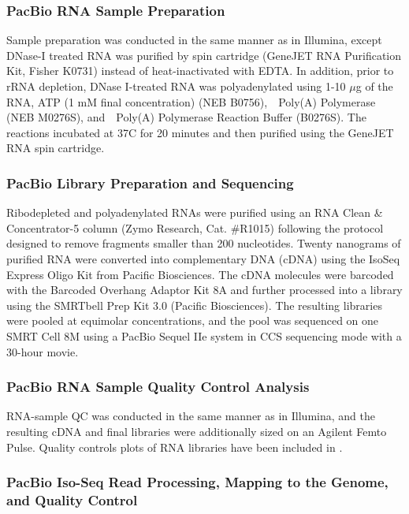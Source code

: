 \subsubsection{PacBio RNA Sample Preparation}

Sample preparation was conducted in the same manner as in Illumina, except DNase-I treated RNA was purified by spin cartridge (GeneJET RNA Purification Kit, Fisher K0731) instead of heat-inactivated with EDTA.
In addition, prior to rRNA depletion, DNase I-treated RNA was polyadenylated using 1-10 $\mu$g of the RNA, ATP (1 mM final concentration) (NEB B0756),~\eco~Poly(A) Polymerase (NEB M0276S), and~\eco~Poly(A) Polymerase Reaction Buffer (B0276S).
The reactions incubated at 37\textdegree C for 20 minutes and then purified using the GeneJET RNA spin cartridge.

\subsubsection{PacBio Library Preparation and Sequencing}

Ribodepleted and polyadenylated RNAs were purified using an RNA Clean \& Concentrator-5 column (Zymo Research, Cat. \#R1015) following the protocol designed to remove fragments smaller than 200 nucleotides.
Twenty nanograms of purified RNA were converted into complementary DNA (cDNA) using the IsoSeq Express Oligo Kit from Pacific Biosciences.
The cDNA molecules were barcoded with the Barcoded Overhang Adaptor Kit 8A and further processed into a library using the SMRTbell Prep Kit 3.0 (Pacific Biosciences).
The resulting libraries were pooled at equimolar concentrations, and the pool was sequenced on one SMRT Cell 8M using a PacBio Sequel IIe system in CCS sequencing mode with a 30-hour movie.

\subsubsection{PacBio RNA Sample Quality Control Analysis}\label{sec:methods-pacbio-qc}
RNA-sample QC was conducted in the same manner as in Illumina, and the resulting cDNA and final libraries were additionally sized on an Agilent Femto Pulse.
Quality controls plots of RNA libraries have been included in \sdqc.

\subsubsection{PacBio Iso-Seq Read Processing, Mapping to the Genome, and Quality Control}

